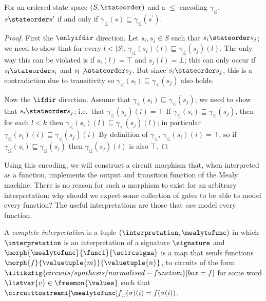 \begin{lemma}
    For an ordered state space \((S,\stateorder)\) and a \(\leq\)-encoding
    \(\gamma_\leq\), \(s \stateorder s^\prime\) if and only if
    \(\gamma_\leq(s) \sqsubseteq \gamma_\leq(s^\prime)\).
\end{lemma}
\begin{proof}
    First the \(\onlyifdir\) direction.
    Let \(s_i, s_j \in S\) such that \(s_i \stateorder s_j\); we need to show
    that for every \(l < |S|\),
    \(\gamma_\leq(s_i)(l) \sqsubseteq \gamma_\leq(s_j)(l)\).
    The only way this can be violated is if \(s_i(l) = \top\) and
    \(s_j(l) = \bot\); this can only occur if \(s_l \stateorder s_i\) and
    \(s_l \not\stateorder s_j\).
    But since \(s_i \stateorder s_j\), this is a contradiction due to
    transitivity so \(\gamma_\leq(s_l) \sqsubseteq \gamma_\leq(s_j)\) also
    holds.

    Now the \(\ifdir\) direction.
    Assume that \(\gamma_\leq(s_i) \sqsubseteq \gamma_\leq(s_j)\); we need to
    show that \(s_i \stateorder s_j\); i.e.\ that \(\gamma_\leq(s_j)(i) = \top\)
    If \(\gamma_\leq(s_i) \sqsubseteq \gamma_\leq(s_j)\), then for each
    \(l < k\) then \(\gamma_\leq(s_i)(l) \sqsubseteq \gamma_\leq(s_j)(l)\);
    in particular \(\gamma_\leq(s_i)(i) \sqsubseteq \gamma_\leq(s_j)(i)\)
    By definition of \(\gamma_\leq\), \(\gamma_\leq(s_i)(i) = \top\), so if
    \(\gamma_\leq(s_i) \sqsubseteq \gamma_\leq(s_j)\) then
    \(\gamma_\leq(s_j)(i)\) is also \(\top\).
\end{proof}

Using this encoding, we will construct a circuit morphism that,
when interpreted as a function, implements the output and transition function
of the Mealy machine.
There is no reason for such a morphism to exist for an arbitrary interpretation:
why should we expect some collection of gates to be able to model every
function?
The useful interpretations are those that \emph{can} model every function.

\begin{definition}\label{def:functional-completeness}
    A \emph{complete interpretation} is a tuple
    \((\interpretation,\mealytofunc)\) in which \(\interpretation\) is an
    interpretation of a signature \(\signature\) and \(
    \morph{\mealytofunc}{\funci}{\scircsigma}
    \) is a map that sends functions \(
    \morph{f}{\valuetuple{m}}{\valuetuple{n}}
    \), to circuits of the form \(
    \iltikzfig{circuits/synthesis/normalised-function}[box=f]
    \) for some word \(\listvar{v} \in \freemon{\values}\) such that
    \(\circuittostreami[\mealytofunc[f]](\sigma)(i) = f(\sigma(i))\).
\end{definition}

